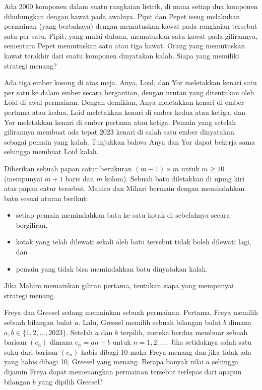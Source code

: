 \documentclass[11pt]{scrartcl}
\begin{document}
\begin{soaljawab}
Ada $2000$ komponen dalam suatu rangkaian listrik, di mana setiap dua komponen dihubungkan dengan kawat pada awalnya. Pipit dan Pepet iseng melakukan permainan (yang berbahaya) dengan memutuskan kawat pada rangkaian tersebut satu per satu. Pipit, yang mulai duluan, memutuskan satu kawat pada gilirannya, sementara Pepet memutuskan satu atau tiga kawat. Orang yang memutuskan kawat terakhir dari suatu komponen dinyatakan kalah. Siapa yang memiliki strategi menang?
\end{soaljawab}

\begin{soaljawab}
Ada tiga ember kosong di atas meja. Anya, Loid, dan Yor meletakkan kenari satu per satu ke dalam ember secara bergantian, dengan urutan yang ditentukan oleh Loid di awal permainan. Dengan demikian, Anya meletakkan kenari di ember pertama atau kedua, Loid meletakkan kenari di ember kedua atau ketiga, dan Yor meletakkan kenari di ember pertama atau ketiga. Pemain yang setelah gilirannya membuat ada tepat 2023 kenari di salah satu ember dinyatakan sebagai pemain yang kalah. Tunjukkan bahwa Anya dan Yor dapat bekerja sama sehingga membuat Loid kalah.
\end{soaljawab}

\begin{soaljawab}
    Diberikan sebuah papan catur berukuran $(m+1) \times m$ untuk $m \ge 10$ (mempunyai $m+1$ baris dan $m$ kolom). Sebuah batu diletakkan di ujung kiri atas papan catur tersebut. Mahiro dan Mihari bermain dengan memindahkan batu sesuai aturan berikut:
    \begin{itemize}
        \item setiap pemain memindahkan batu ke satu kotak di sebelahnya secara bergiliran,
        \item kotak yang telah dilewati sekali oleh batu tersebut tidak boleh dilewati lagi, dan
        \item pemain yang tidak bisa memindahkan batu dinyatakan kalah.
    \end{itemize}
    Jika Mahiro memainkan giliran pertama, tentukan siapa yang mempunyai strategi menang.
\end{soaljawab}

\begin{soaljawab}
    Freya dan Greesel sedang memainkan sebuah permainan. Pertama, Freya memilih sebuah bilangan bulat $a$. Lalu, Greesel memilih sebuah bilangan bulat $b$ dimana $a,b \in \{1,2,\dots,2023\}$. Setelah $a$ dan $b$ terpilih, mereka berdua membuar sebuah barisan $(c_n)$ dimana $c_n = an + b$ untuk $n = 1,2,\dots$. Jika setidaknya salah satu suku dari barisan $(c_n)$ habis dibagi 10 maka Freya menang dan jika tidak ada yang habis dibagi 10, Greesel yang menang. Berapa banyak nilai $a$ sehingga dijamin Freya dapat memenangkan permainan tersebut terlepas dari apapun bilangan $b$ yang dipilih Greesel?
\end{soaljawab}
\end{document}
